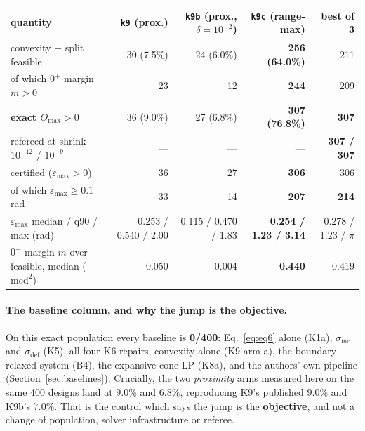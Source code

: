 \documentclass[11pt,a4paper]{article}
\theoremstyle{definition}
\newcommand{\Tmax}{\Theta_{\max}}
\begin{document}
\begin{center}
\footnotesize
\begin{tabular}{@{}lrrrr@{}}
\toprule
quantity & \texttt{k9} (prox.) & \texttt{k9b} (prox., $\delta{=}10^{-2}$) & \textbf{\texttt{k9c} (range-max)} & best of 3 \\
\midrule
convexity $+$ split feasible & 30 (7.5\%) & 24 (6.0\%) & \textbf{256 (64.0\%)} & 211 \\
\quad of which $0^+$ margin $m>0$ & 23 & 12 & \textbf{244} & 209 \\
\textbf{exact $\Tmax>0$} & 36 (9.0\%) & 27 (6.8\%) & \textbf{307 (76.8\%)} & \textbf{307} \\
refereed at shrink $10^{-12}$ / $10^{-9}$ & --- & --- & --- & \textbf{307 / 307} \\
certified ($\varepsilon_{\max}>0$) & 36 & 27 & \textbf{306} & 306 \\
\quad of which $\varepsilon_{\max}\ge0.1$ rad & 33 & 14 & \textbf{207} & \textbf{214} \\
$\varepsilon_{\max}$ median / q90 / max (rad) & 0.253 / 0.540 / 2.00 & 0.115 / 0.470 / 1.83 & \textbf{0.254 / 1.23 / 3.14} & 0.278 / 1.23 / $\pi$ \\
$0^+$ margin $m$ over feasible, median ($\mathrm{med}^2$) & 0.050 & 0.004 & \textbf{0.440} & 0.419 \\
\bottomrule
\end{tabular}
\end{center}

\paragraph{The baseline column, and why the jump is the objective.} On this exact population
every baseline is \textbf{0/400}: Eq.~\eqref{eq:eq6} alone (K1a), $\sigma_{\mathrm{mc}}$ and
$\sigma_{\mathrm{def}}$ (K5), all four K6 repairs, convexity alone (K9 arm a), the
boundary-relaxed system (B4), the expansive-cone LP (K8a), and the authors' own pipeline
(Section~\ref{sec:baselines}). Crucially, the two \emph{proximity} arms measured here on the
same 400 designs land at $9.0\%$ and $6.8\%$, reproducing K9's published $9.0\%$ and K9b's
$7.0\%$. That is the control which says the jump is the \textbf{objective}, and not a change
of population, solver infrastructure or referee.
\end{document}
